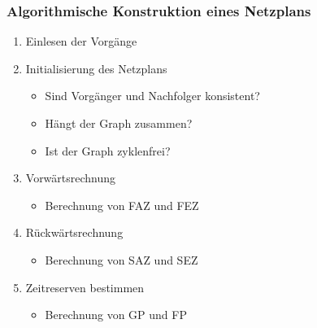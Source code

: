 \documentclass[ngerman, t]{beamer}
\begin{document}
\begin{frame}
  \frametitle{Algorithmische Konstruktion eines Netzplans}
  \begin{enumerate}
    \item Einlesen der Vorg\"ange
    \item Initialisierung des Netzplans
      \begin{itemize}
        \item Sind Vorg\"anger und Nachfolger konsistent?
        \item H\"angt der Graph zusammen?
        \item Ist der Graph zyklenfrei?
      \end{itemize}
    \item Vorw\"artsrechnung
      \begin{itemize}
        \item Berechnung von FAZ und FEZ
      \end{itemize}
    \item R\"uckw\"artsrechnung
      \begin{itemize}
        \item Berechnung von SAZ und SEZ
      \end{itemize}
    \item Zeitreserven bestimmen
      \begin{itemize}
        \item Berechnung von GP und FP
      \end{itemize}
  \end{enumerate}
\end{frame}
\end{document}
